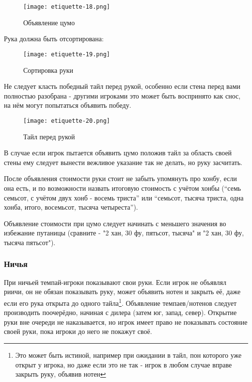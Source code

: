 \begin{figure}[H]
	\centering
	\texttt{[image: etiquette-18.png]}
	\caption{Объявление цумо}
\end{figure}

Рука должна быть отсортирована:

\begin{figure}[H]
	\centering
	\texttt{[image: etiquette-19.png]}
	\caption{Сортировка руки}
\end{figure}

Не следует класть победный тайл перед рукой, особенно если стена перед вами полностью разобрана - другими игроками это может быть воспринято как снос, на нём могут попытаться объявить победу.

\begin{figure}[H]
	\centering
	\texttt{[image: etiquette-20.png]}
	\caption{Тайл перед рукой}
\end{figure}

В случае если игрок пытается объявить цумо положив тайл за область своей стены ему следует вынести вежливое указание так не делать, но руку засчитать. 

После объявления стоимости руки стоит не забыть упомянуть про хонбу, если она есть, и по возможности назвать итоговую стоимость с учётом хонбы (“семь семьсот, с учётом двух хонб - восемь триста” или “семьсот, тысяча триста, одна хонба, итого, восемьсот, тысяча четыреста”).

Объявление стоимости при цумо следует начинать с меньшего значения во избежание путаницы (сравните - "2 хан, 30 фу, пятьсот, тысяча" и "2 хан, 30 фу, тысяча пятьсот").

\subsubsection{Ничья}

При ничьей темпай-игроки показывают свои руки. Если игрок не объявлял риичи, он не обязан показывать руку, может объявить нотен и закрыть её, даже если его рука открыта до одного тайла\footnote{Это может быть истиной, например при ожидании в тайл, пон которого уже открыт у игрока, но даже если это не так - игрок в любом случае вправе закрыть руку, объявив нотен}. Объявление темпаев/нотенов следует производить поочерёдно, начиная с дилера (затем юг, запад, север). Открытие руки вне очереди не наказывается, но игрок имеет право не показывать состояние своей руки, пока игроки до него не покажут своё.

